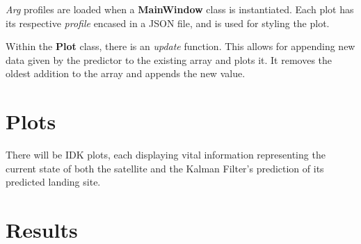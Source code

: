 \documentclass[12pt, a4paper]{article}
\begin{document}
\textit{Arg} profiles are loaded when a \textbf{MainWindow} class is instantiated. Each plot has its respective \textit{profile} encased in a JSON file, and is used for styling the plot.

Within the \textbf{Plot} class, there is an \textit{update} function. This allows for appending new data given by the predictor to the existing array and plots it. It removes the oldest addition to the array and appends the new value. 
\section{Plots}
There will be IDK plots, each displaying vital information representing the current state of both the satellite and the Kalman Filter's prediction of its predicted landing site. 

\section{Results}
\end{document}

